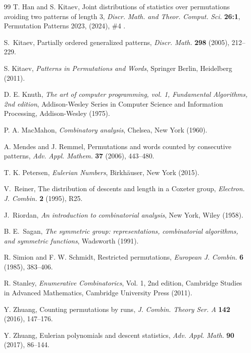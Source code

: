 \documentclass[11pt,reqno]{amsart}
\numberwithin{equation}{section}
\theoremstyle{plain}
\theoremstyle{definition}
\begin{document}
\begin{thebibliography}{99}
 T. Han and S. Kitaev, Joint distributions of statistics over permutations avoiding two patterns of length 3, {\em Discr. Math. and Theor. Comput. Sci.} {\bf 26:1}, Permutation Patterns 2023, (2024),  \#4 .

     S.~Kitaev, Partially ordered generalized patterns, {\em Discr. Math.} {\bf298} (2005), 212--229.
    
     S. Kitaev, {\it Patterns in Permutations and Words}, Springer Berlin, Heidelberg (2011).
    
     D. E. Knuth, {\it The art of computer programming, vol. 1, Fundamental Algorithms, 2nd edition}, Addison-Wesley Series in Computer Science and Information Processing, Addison-Wesley (1975).  
    
     P. A. MacMahon, {\it Combinatory analysis}, Chelsea, New York (1960).

     A. Mendes and J. Remmel, Permutations and words counted by consecutive patterns, {\em Adv. Appl. Mathem.} {\bf37} (2006), 443--480.
    
    T. K. Petersen, {\it Eulerian Numbers}, Birkh\"auser, New York (2015).

     V.~Reiner, The distribution of descents and length in a Coxeter group, {\em Electron. J. Combin.} {\bf2} (1995), R25.

     J.~Riordan, {\it An introduction to combinatorial analysis}, New York, Wiley (1958).

     B. E.~Sagan, {\it The symmetric group: representations, combinatorial algorithms, and symmetric functions}, Wadsworth (1991).

     R. Simion and F. W. Schmidt, Restricted permutations, {\em European J. Combin.} \textbf{6} (1985), 383--406.
    
    R. Stanley, { \it Enumerative Combinatorics}, Vol. 1, 2nd edition, Cambridge Studies in Advanced Mathematics, Cambridge University Press (2011). 
    
    Y. Zhuang, Counting permutations by runs, {\em J. Combin. Theory Ser. A} \textbf{142} (2016), 147--176.
    
   Y. Zhuang, Eulerian polynomials and descent statistics, {\em Adv. Appl. Math.} \textbf{90} (2017), 86--144.
    
\end{thebibliography}
\end{document}
